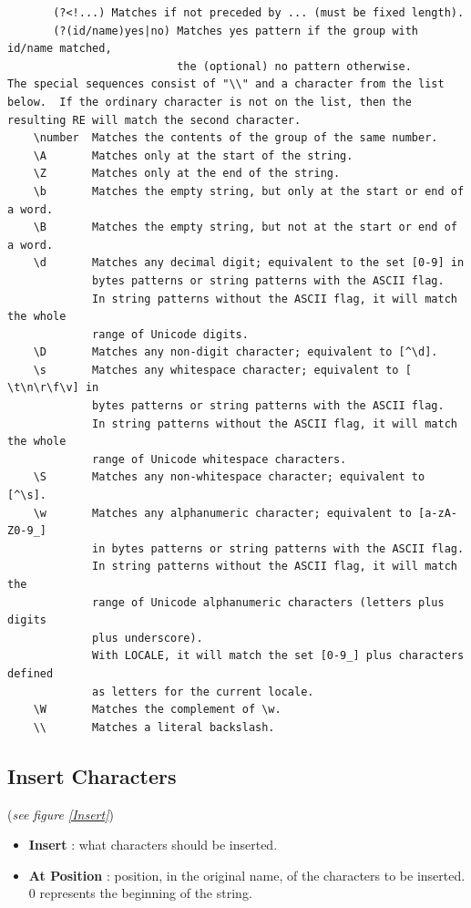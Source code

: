 \documentclass[10pt, a4paper]{scrartcl}
\begin{document}
\begin{itemize}
\begin{verbatim}
       (?<!...) Matches if not preceded by ... (must be fixed length).
       (?(id/name)yes|no) Matches yes pattern if the group with id/name matched,
                          the (optional) no pattern otherwise.
The special sequences consist of "\\" and a character from the list
below.  If the ordinary character is not on the list, then the
resulting RE will match the second character.
    \number  Matches the contents of the group of the same number.
    \A       Matches only at the start of the string.
    \Z       Matches only at the end of the string.
    \b       Matches the empty string, but only at the start or end of a word.
    \B       Matches the empty string, but not at the start or end of a word.
    \d       Matches any decimal digit; equivalent to the set [0-9] in
             bytes patterns or string patterns with the ASCII flag.
             In string patterns without the ASCII flag, it will match the whole
             range of Unicode digits.
    \D       Matches any non-digit character; equivalent to [^\d].
    \s       Matches any whitespace character; equivalent to [ \t\n\r\f\v] in
             bytes patterns or string patterns with the ASCII flag.
             In string patterns without the ASCII flag, it will match the whole
             range of Unicode whitespace characters.
    \S       Matches any non-whitespace character; equivalent to [^\s].
    \w       Matches any alphanumeric character; equivalent to [a-zA-Z0-9_]
             in bytes patterns or string patterns with the ASCII flag.
             In string patterns without the ASCII flag, it will match the
             range of Unicode alphanumeric characters (letters plus digits
             plus underscore).
             With LOCALE, it will match the set [0-9_] plus characters defined
             as letters for the current locale.
    \W       Matches the complement of \w.
    \\       Matches a literal backslash.
\end{verbatim}
         \endgroup
\end{itemize}

\subsection*{Insert Characters}
(\emph{see figure \ref{Insert}})\\
\begin{itemize}
        \item \textbf{Insert} : what characters should be inserted.
        \item \textbf{At Position} : position, in the original name, of the characters to be inserted. 0 represents the beginning of the string.
\end{itemize}
\end{document}

